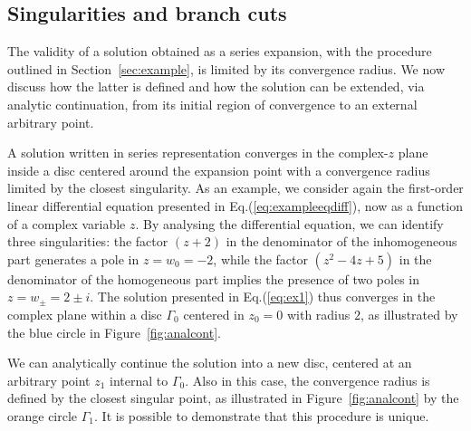 \documentclass[final,1p,times]{elsarticle}
\begin{document}

\subsection{Singularities and branch cuts}
\label{sec:cuts}

The validity of a solution obtained as a series expansion, with the procedure outlined in Section~\ref{sec:example}, is limited by its convergence radius.
We now discuss how the latter is defined and how the solution can be extended, via analytic continuation, from its initial region of convergence to an external arbitrary point.

A solution written in series representation converges in the complex-$z$ plane inside a disc centered around the expansion point with a convergence radius limited by the closest singularity.
As an example, we consider again the first-order linear differential equation presented in Eq.(\ref{eq:exampleeqdiff}), now as a function of a complex variable $z$.
By analysing the differential equation, we can identify three singularities: the factor $(z+2)$ in the denominator of the inhomogeneous part generates a pole in $z=w_0=-2$, while the factor $(z^2-4z+5)$ in the denominator of the homogeneous part implies the presence of two poles in $z=w_\pm=2\pm i$.
The solution presented in Eq.(\ref{eq:ex1}) thus converges in the complex plane within a disc $\Gamma_0$ centered in $z_0=0$ with radius $2$, as illustrated by the blue circle in Figure~\ref{fig:analcont}.

We can analytically continue the solution into a new disc, centered at an arbitrary point $z_1$ internal to $\Gamma_0$. Also in this case, the convergence radius is defined by the closest singular point, as illustrated in Figure~\ref{fig:analcont} by the orange circle $\Gamma_1$.
It is possible to demonstrate that this procedure is unique.
\end{document}
